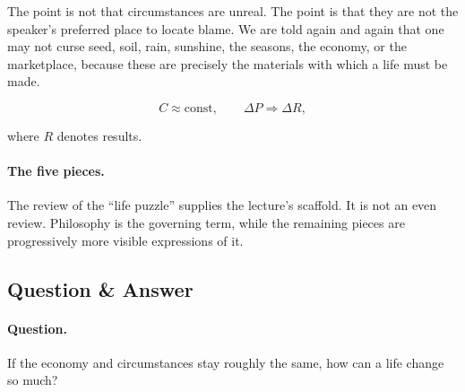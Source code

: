 The point is not that circumstances are unreal. The point is that they are not the speaker's preferred place to locate blame. We are told again and again that one may not curse seed, soil, rain, sunshine, the seasons, the economy, or the marketplace, because these are precisely the materials with which a life must be made.

\begin{equation}
C \approx \text{const}, \qquad \Delta P \Rightarrow \Delta R,
\end{equation}

where \(R\) denotes results.

\paragraph{The five pieces.}
The review of the ``life puzzle'' supplies the lecture's scaffold. It is not an even review. Philosophy is the governing term, while the remaining pieces are progressively more visible expressions of it.

\begin{figure}
\centering
{}
\end{figure}

\subsection{Question \& Answer}

\paragraph{Question.}
If the economy and circumstances stay roughly the same, how can a life change so much?

